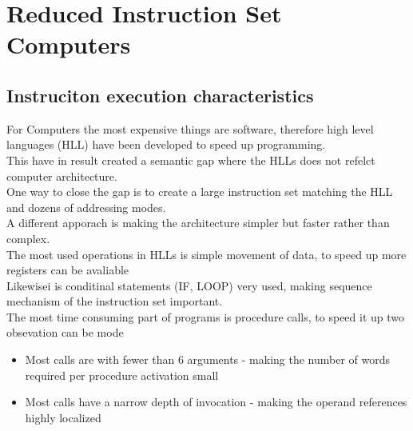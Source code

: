 \documentclass[12pt, a4paper]{article}
\begin{document}
	\section{Reduced Instruction Set Computers}
		\subsection{Instruciton execution characteristics}
			For Computers the most expensive things are software, therefore high level languages (HLL) have been developed to speed up programming.\\
			This have in result created a semantic gap where the HLLs does not refelct computer architecture.\\
			One way to close the gap is to create a large instruction set matching the HLL and dozens of addressing modes.\\
			A different apporach is making the architecture simpler but faster rather than complex.\\
			The most used operations in HLLs is simple movement of data, to speed up more registers can be avaliable\\
			Likewisei is conditinal statements (IF, LOOP) very used, making sequence mechanism of the instruction set important.\\
			The most time consuming part of programs is procedure calls, to speed it up two obsevation can be mode
			\begin{itemize}
				\item Most calls are with fewer than 6 arguments - making the number of words required per procedure activation small
				\item Most calls have a narrow depth of invocation - making the operand references highly localized
			\end{itemize}
\end{document}
